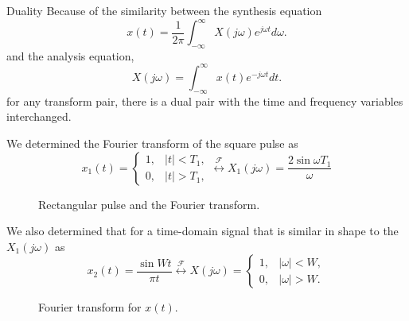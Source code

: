 \begin{frame}{Duality}
    Because of the similarity between the synthesis equation
    \begin{equation}
        x(t) = \frac{1}{2\pi}\int_{-\infty}^{\infty}X(j\omega)e^{j\omega t} d\omega.
    \end{equation}
    and the analysis equation,
    \begin{equation}
        X(j\omega) = \int_{-\infty}^{\infty}x(t)e^{-j\omega t} dt.
    \end{equation}
    for any transform pair, there is a dual pair with the time and frequency variables interchanged.
\end{frame}

\begin{frame}

        We determined the Fourier transform of the square pulse as
        \begin{equation*}
            x_1(t) = \begin{cases}
                1,& |t| < T_1,\\
                0, & |t| > T_1,
            \end{cases}
             \overset{\mathcal{F}}{\longleftrightarrow}
             X_1(j\omega) = \frac{2\sin \omega T_1}{\omega}
        \end{equation*}

        \begin{figure}
          \centering
          
          \caption{Rectangular pulse and the Fourier transform.}\label{fi:square_pulse}
        \end{figure}

\end{frame}


\begin{frame}
        We also determined that for a time-domain signal that is similar in shape to the $X_1(j\omega)$ as
        \begin{equation*}
        x_2(t) = \frac{\sin W t}{\pi t}
         \overset{\mathcal{F}}{\longleftrightarrow}
            X(j\omega) = \begin{cases}
                1,& |\omega| < W,\\
                0, & |\omega| > W.
            \end{cases}
        \end{equation*}
        \begin{figure}
          \centering
          
          \caption{Fourier transform for $x(t)$.}\label{fi:xomega_square}
        \end{figure}
\end{frame}



